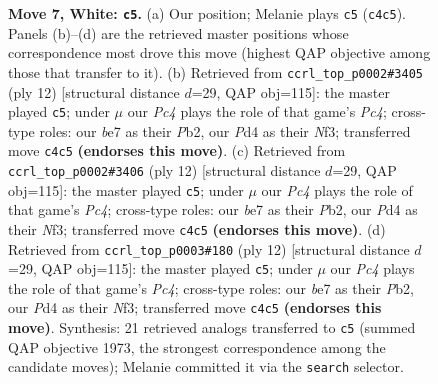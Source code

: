 \documentclass[11pt]{article}
\begin{document}
\begin{figure}[p]
\caption{\textbf{Move 7, White: \texttt{c5}.} (a) Our position; Melanie plays \texttt{c5} (\texttt{c4c5}). Panels (b)--(d) are the retrieved master positions whose correspondence most drove this move (highest QAP objective among those that transfer to it). (b) Retrieved from \texttt{ccrl\_top\_p0002\#3405} (ply 12) [structural distance $d$=29, QAP obj=115]: the master played \texttt{c5}; under $\mu$ our \emph{Pc4} plays the role of that game's \emph{Pc4}; cross-type roles: our \emph{b}e7 as their \emph{P}b2, our \emph{P}d4 as their \emph{N}f3; transferred move \texttt{c4c5} \textbf{(endorses this move)}. (c) Retrieved from \texttt{ccrl\_top\_p0002\#3406} (ply 12) [structural distance $d$=29, QAP obj=115]: the master played \texttt{c5}; under $\mu$ our \emph{Pc4} plays the role of that game's \emph{Pc4}; cross-type roles: our \emph{b}e7 as their \emph{P}b2, our \emph{P}d4 as their \emph{N}f3; transferred move \texttt{c4c5} \textbf{(endorses this move)}. (d) Retrieved from \texttt{ccrl\_top\_p0003\#180} (ply 12) [structural distance $d$=29, QAP obj=115]: the master played \texttt{c5}; under $\mu$ our \emph{Pc4} plays the role of that game's \emph{Pc4}; cross-type roles: our \emph{b}e7 as their \emph{P}b2, our \emph{P}d4 as their \emph{N}f3; transferred move \texttt{c4c5} \textbf{(endorses this move)}. Synthesis: 21 retrieved analogs transferred to \texttt{c5} (summed QAP objective 1973, the strongest correspondence among the candidate moves); Melanie committed it via the \texttt{search} selector.}
\label{fig:thought-m12}
\end{figure}

\clearpage
\end{document}

